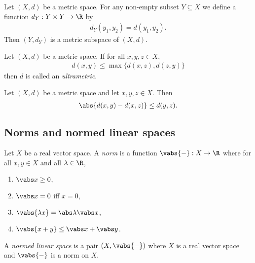 \documentclass{article}
\begin{document}
\begin{definition}
    Let $(X,d)$ be a metric space. For any non-empty subset $Y\subseteq X$ we define
    a function $d_Y:Y\times Y\to\R$ by
    \begin{align*}
        d_Y(y_1,y_2)=d(y_1,y_2).
    \end{align*}
    Then $(Y,d_Y)$ is a metric subspace of $(X,d)$.
\end{definition}

\begin{definition}[Ultrametric]
    Let $(X,d)$ be a metric space. If for all $x,y,z\in X$,
    \begin{align*}
        d(x,y)\leq \max\{d(x,z),d(z,y)\}
    \end{align*}
    then $d$ is called an \emph{ultrametric}.
\end{definition}

\begin{proposition}
    Let $(X,d)$ be a metric space and let $x,y,z\in X$. Then
    \begin{align*}
        \abs{d(x,y)-d(x,z)}\leq d(y,z).
    \end{align*}
\end{proposition}

\subsection{Norms and normed linear spaces}

\begin{definition}
    Let $X$ be a real vector space. A \emph{norm} is a function $\vabs{-}:X\to\R$
    where for all $x,y\in X$ and all $\lambda\in\R$,
    \begin{enumerate}
        \item $\vabs x \geq 0$,
        \item $\vabs x = 0$ iff $x = 0$,
        \item $\vabs{\lambda x}=\abs \lambda \vabs x$,
        \item $\vabs{x+y}\leq \vabs x +\vabs y$.
    \end{enumerate}
    A \emph{normed linear space} is a pair $(X,\vabs{-})$ where $X$ is a real vector
    space and $\vabs{-}$ is a norm on $X$.
\end{definition}
\end{document}
